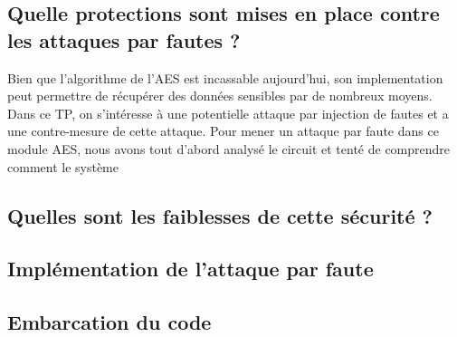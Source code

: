 \subsection{Quelle protections sont mises en place contre les attaques par fautes ?}

Bien que l'algorithme de l'AES est incassable aujourd'hui, son implementation peut permettre de récupérer des données sensibles par de nombreux moyens.
Dans ce TP, on s'intéresse à une potentielle attaque par injection de fautes et a une contre-mesure de cette attaque. 
Pour mener un attaque par faute  dans ce module AES, nous avons tout d'abord analysé le circuit et tenté de comprendre comment le système 


\subsection{Quelles sont les faiblesses de cette sécurité ?}

\subsection{Implémentation de l'attaque par faute}

\subsection{Embarcation du code}
